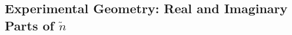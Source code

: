 %
%

\subsection{Experimental Geometry: Real and Imaginary Parts of $\tilde{n}$}
\label{sec:real_imag_index}


